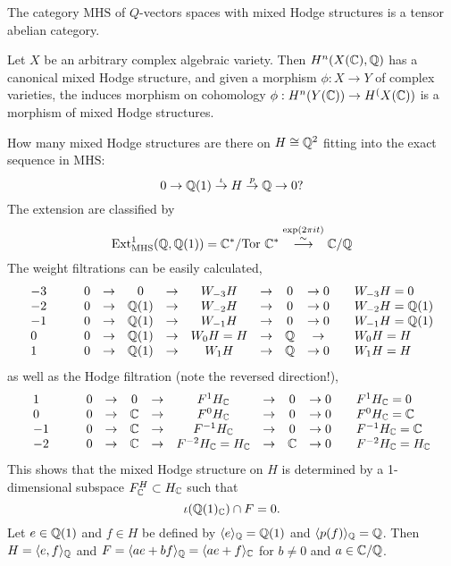 \begin{cor}
The category $\mathrm{MHS}$ of $Q$-vectors spaces with mixed Hodge structures is a tensor abelian category.
\end{cor}

\begin{thm}[Deligne]
Let $X$ be an arbitrary complex algebraic variety. Then $H^n(X(\mathbb{C}), \mathbb{Q})$ has a canonical mixed Hodge structure, and given a morphism $\phi : X \to Y$ of complex varieties, the induces morphism on cohomology $\phi : H^n(Y(\mathbb{C})) \to H^(X(\mathbb{C}))$ is a morphism of mixed Hodge structures.
\end{thm}

\begin{exam}
How many mixed Hodge structures are there on $H \cong \mathbb{Q}^2$ fitting into the exact sequence in $\mathrm{MHS}$:
\[
0 \to \mathbb{Q}(1) \stackrel{\iota}{\to} H \stackrel{p}{\to} \mathbb{Q} \to 0 ? 
\]
The extension are classified by 
\[
\mathrm{Ext}^1_{\mathrm{MHS}}(\mathbb{Q}, \mathbb{Q}(1)) = \mathbb{C}^* / \mathrm{Tor~}\mathbb{C}^* \stackrel{\exp(2\pi i t)}{\stackrel{\sim}{\longrightarrow}} \mathbb{C} / \mathbb{Q}
\]
The weight filtrations can be easily calculated,
\[
\begin{array}{lrcccccccl}
-3 \qquad & 0 & \to & 0 & \to & W_{-3}H & \to & 0 & \to 0 & \quad W_{-3}H = 0 \\
-2 \qquad & 0 & \to & \mathbb{Q}(1) & \to & W_{-2}H & \to & 0 & \to 0 & \quad W_{-2}H = \mathbb{Q}(1) \\
-1 \qquad & 0 & \to & \mathbb{Q}(1) & \to & W_{-1}H & \to & 0 & \to 0 & \quad W_{-1}H = \mathbb{Q}(1) \\
0 \qquad & 0 & \to & \mathbb{Q}(1) & \to & W_0H = H & \to & \mathbb{Q} & \to & \quad W_0H = H \\
1 \qquad & 0 & \to & \mathbb{Q}(1) & \to & W_1H & \to & \mathbb{Q} & \to 0 & \quad W_1H = H
\end{array}
\]
as well as the Hodge filtration (note the reversed direction!),
\[
\begin{array}{lrcccccccl}
1 \qquad & 0 & \to & 0 & \to & F^{1}H_{\mathbb{C}} & \to & 0 & \to 0 & \quad F^{1}H_{\mathbb{C}} = 0 \\
0 \qquad & 0 & \to & \mathbb{C} & \to & F^{0}H_{\mathbb{C}} & \to & 0 & \to 0 & \quad F^{0}H_{\mathbb{C}} = \mathbb{C} \\
-1 \qquad & 0 & \to & \mathbb{C} & \to & F^{-1}H_{\mathbb{C}} & \to & 0 & \to 0 & \quad F^{-1}H_{\mathbb{C}} = \mathbb{C} \\
-2 \qquad & 0 & \to & \mathbb{C} & \to & F^{-2}H_{\mathbb{C}} = H_{\mathbb{C}} & \to & \mathbb{C} & \to 0 & \quad F^{-2}H_{\mathbb{C}} = H_{\mathbb{C}} \\
\end{array}
\]
This shows that the mixed Hodge structure on $H$ is determined by a 1-dimensional subspace $F^H_{\mathbb{C}} \subset H_{\mathbb{C}}$ such that
\[
\iota(\mathbb{Q}(1)_{\mathbb{C}}) \cap F = 0.
\]
Let $e \in \mathbb{Q}(1)$ and $f \in H$ be defined by $\langle e\rangle_{\mathbb{Q}} = \mathbb{Q}(1)$ and $\langle p(f) \rangle_{\mathbb{Q}} = \mathbb{Q}$. Then $H = \langle e, f \rangle_{\mathbb{Q}}$ and $F = \langle ae + bf \rangle_{\mathbb{Q}} = \langle ae + f \rangle_{\mathbb{C}}$ for $b \neq 0$ and $a \in \mathbb{C} / \mathbb{Q}$.
\end{exam}


